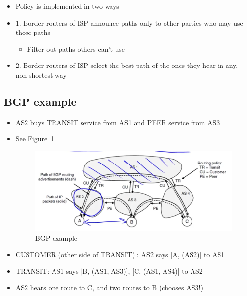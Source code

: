 \documentclass[12pt]{ctexart}   %
\begin{document}
\begin{itemize}
		 \item Policy is implemented in two ways
		 \item {\color{blue} 1.} Border routers of ISP announce paths only to other parties who may use those paths
		 \begin{itemize}
		 	\item Filter out paths others can't use
		 \end{itemize}
		 \item {\color{blue} 2.} Border routers of ISP select the best path of the ones they hear in any, non-shortest way
	\end{itemize}
	
	\subsection{BGP example}
	\begin{itemize}
		\item AS2 buys TRANSIT service from AS1 and PEER service from AS3
		\item See Figure~\ref{fig:5-12-5}
			
		\begin{figure}[h!] %
		\centering
		 \includegraphics[scale=0.7]{images/5-12-5}
		\caption{ BGP example }
		 \label{fig:5-12-5}
		 \end{figure}
		 
		 \item CUSTOMER (other side of TRANSIT) : AS2 says [A, (AS2)] to AS1
		 \item TRANSIT: AS1 says [B, (AS1, AS3)], [C, (AS1, AS4)] to AS2
		\item AS2 hears one route to C, and two routes to B (chooses AS3!)
	\end{itemize}
	
\end{document}
